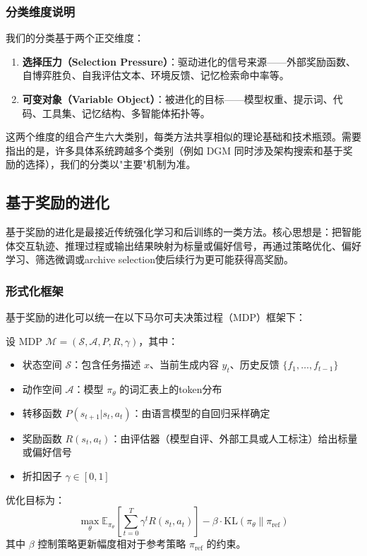 \subsubsection{分类维度说明}

我们的分类基于两个正交维度：

\begin{enumerate}
\item \textbf{选择压力（Selection Pressure）}：驱动进化的信号来源——外部奖励函数、自博弈胜负、自我评估文本、环境反馈、记忆检索命中率等。
\item \textbf{可变对象（Variable Object）}：被进化的目标——模型权重、提示词、代码、工具集、记忆结构、多智能体拓扑等。
\end{enumerate}

这两个维度的组合产生六大类别，每类方法共享相似的理论基础和技术瓶颈。需要指出的是，许多具体系统跨越多个类别（例如 DGM 同时涉及架构搜索和基于奖励的选择），我们的分类以"主要"机制为准。

\subsection{基于奖励的进化}\label{sec:reward}

基于奖励的进化是最接近传统强化学习和后训练的一类方法。核心思想是：把智能体交互轨迹、推理过程或输出结果映射为标量或偏好信号，再通过策略优化、偏好学习、筛选微调或archive selection使后续行为更可能获得高奖励。

\subsubsection{形式化框架}

基于奖励的进化可以统一在以下马尔可夫决策过程（MDP）框架下：

\begin{definition}
设 MDP $\mathcal{M} = (\mathcal{S}, \mathcal{A}, P, R, \gamma)$，其中：
\begin{itemize}
\item 状态空间 $\mathcal{S}$：包含任务描述 $x$、当前生成内容 $y_t$、历史反馈 $\{f_1, \ldots, f_{t-1}\}$
\item 动作空间 $\mathcal{A}$：模型 $\pi_\theta$ 的词汇表上的token分布
\item 转移函数 $P(s_{t+1} | s_t, a_t)$：由语言模型的自回归采样确定
\item 奖励函数 $R(s_t, a_t)$：由评估器（模型自评、外部工具或人工标注）给出标量或偏好信号
\item 折扣因子 $\gamma \in [0, 1]$
\end{itemize}
优化目标为：
\begin{equation}
\max_\theta \mathbb{E}_{\pi_\theta}\left[\sum_{t=0}^{T} \gamma^t R(s_t, a_t)\right] - \beta \cdot \mathrm{KL}(\pi_\theta \| \pi_{\mathrm{ref}})
\label{eq:reward-mdp}
\end{equation}
其中 $\beta$ 控制策略更新幅度相对于参考策略 $\pi_{\mathrm{ref}}$ 的约束。
\end{definition}

